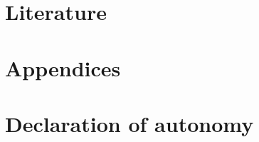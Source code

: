 \documentclass[12pt, a4paper]{report}
\begin{document}
\chapter{Literature}
\printbibliography
\chapter{Appendices}
\chapter{Declaration of autonomy}
\end{document}

